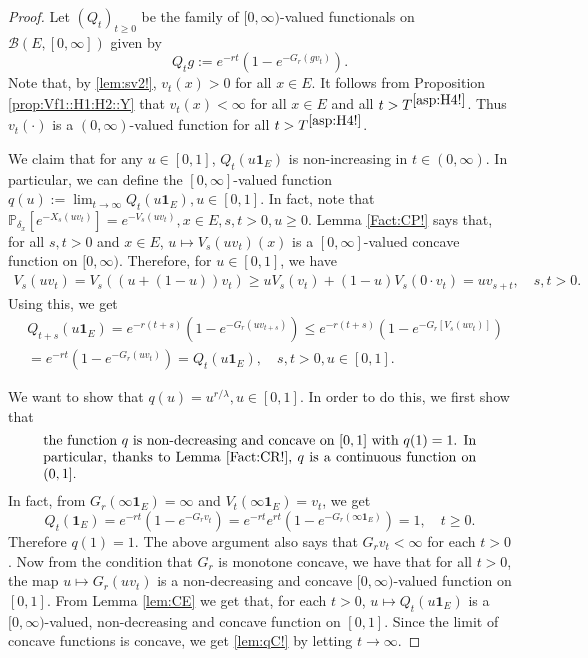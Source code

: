 \documentclass[12pt,a4paper]{amsart}
\numberwithin{equation}{section}
\theoremstyle{plain}
\theoremstyle{definition}
\theoremstyle{remark}
\begin{document}
\begin{proof}
	Let $(Q_t)_{t\geq 0}$ be the family of $[0,\infty)$-valued functionals on $\mathcal B(E,[0,\infty])$ given by
\[
	Q_tg
	:= e^{- r t}( 1 - e^{-G_r(gv_t)} ).
\]
	Note that, by \eqref{lem:sv2!}, $v_t(x)>0$ for all $x\in E$.
	It follows  from Proposition \ref{prop:Vf1::H1:H2::Y} that $v_t(x)<\infty$ for all $x\in E$ and all $t> T^{\eqref{asp:H4!}}$.
	Thus $v_t(\cdot)$ is a $(0,\infty)$-valued function for all $t> T^{\eqref{asp:H4!}}$.

	We claim that for any $u \in [0,1]$, 
	$Q_t(u \mathbf 1_E)$ is non-increasing in $t\in (0,\infty)$.
	In particular, we can define the $[0,\infty]$-valued function 
	$q(u):= \lim_{t\to \infty} Q_t(u \mathbf 1_E), u\in [0,1]$.
	In fact, note that $\mathbb P_{\delta_x}[e^{- X_s(uv_t)}] = e^{-V_s(uv_t)},x\in E, s,t>0, u \geq 0$.
	Lemma \ref{Fact:CP!} says that, for all $s,t > 0$ and $x\in E$, $u\mapsto V_s(uv_t)(x) $ is a $[0,\infty]$-valued concave function on $[0,\infty)$.
	Therefore, for $u\in [0,1]$, we have
\begin{align}
	V_s(uv_t)
	=V_s((u+ (1-u))v_t)
	\geq uV_s(v_t) + (1-u) V_s(0\cdot v_t)
	= uv_{s+t},
	\quad s,t > 0.
\end{align}
	Using this, we get
\begin{align}
	& Q_{t+s}(u \mathbf 1_E)
	= e^{- r (t+s)} ( 1-e^{-G_r(uv_{t+s})} )
	\leq e^{- r(t+s)}( 1-e^{-G_r[V_s(uv_t)]} ) \\
	& = e^{-r t}( 1-e^{-G_r(uv_t)} )
	= Q_t(u \mathbf 1_E),
	\quad s,t > 0, u \in [0,1].
\end{align}

	We want to show that $q(u)= u^{r/\lambda}, u\in [0,1]$.
	In order to do this, we first show that
\begin{equation} \label{lem:qC!}
\begin{minipage}{0.9\textwidth}
	the function $q$ is non-decreasing and concave on $[0,1]$ with $q(1) = 1$.
	In particular, thanks to Lemma \ref{Fact:CR!}, $q$ is a continuous function on $(0,1]$.
\end{minipage}
\end{equation}
	In fact, from $G_r(\infty \mathbf 1_E) = \infty$ and $V_t(\infty \mathbf 1_E) = v_t$, we get
	\[
	Q_t( \mathbf 1_E)
	= e^{- r t} ( 1-e^{-G_r v_t} )
	= e^{- r t} e^{r t}( 1-e^{-G_r (\infty \mathbf 1_E)} )
	= 1,
	\quad t\geq 0.
	\]
	Therefore $q(1) = 1$.
	The above argument also says that $G_r v_t < \infty$ for each $t>0$.
	Now from the condition that $G_r$ is monotone concave, we have that for all $t>0$, the map $u \mapsto G_r(uv_t)$ is a non-decreasing and concave $[0,\infty)$-valued function on $[0,1]$.
	From Lemma \ref{lem:CE} we get that, for each $t> 0$, $u \mapsto Q_t(u \mathbf 1_E)$ is a $[0,\infty)$-valued, non-decreasing and concave function on $[0,1]$.
	Since the limit of concave functions is concave, we get \eqref{lem:qC!} by letting $t\to \infty$.


\end{proof}
\end{document}
